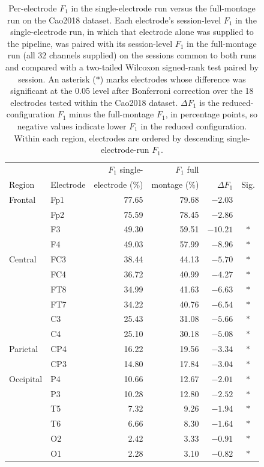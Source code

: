 \documentclass[journal,twoside,web]{ieeecolor}
\begin{document}
\begin{table}[htbp]
  \centering
  \renewcommand{\baselinestretch}{1}\normalsize
  \caption{Per-electrode $F_1$ in the single-electrode run versus the full-montage run on the Cao2018 dataset. Each electrode's session-level $F_1$ in the single-electrode run, in which that electrode alone was supplied to the pipeline, was paired with its session-level $F_1$ in the full-montage run (all 32 channels supplied) on the sessions common to both runs and compared with a two-tailed Wilcoxon signed-rank test paired by session. An asterisk ($*$) marks electrodes whose difference was significant at the 0.05 level after Bonferroni correction over the 18 electrodes tested within the Cao2018 dataset. $\Delta F_1$ is the reduced-configuration $F_1$ minus the full-montage $F_1$, in percentage points, so negative values indicate lower $F_1$ in the reduced configuration. Within each region, electrodes are ordered by descending single-electrode-run $F_1$.}
  \label{tab:app_single_cao2018}
  \footnotesize
  \setlength{\tabcolsep}{2.5pt}
  \begin{tabular}{@{}llrrrc@{}}
    \toprule
     &  & $F_1$ single- & $F_1$ full &  & \\
    Region & Electrode & electrode (\%) & montage (\%) & $\Delta F_1$ & Sig. \\
    \midrule
    Frontal & Fp1 & 77.65 & 79.68 & $-2.03$ & \\
     & Fp2 & 75.59 & 78.45 & $-2.86$ & \\
     & F3 & 49.30 & 59.51 & $-10.21$ & $*$ \\
     & F4 & 49.03 & 57.99 & $-8.96$ & $*$ \\
    \addlinespace
    Central & FC3 & 38.44 & 44.13 & $-5.70$ & $*$ \\
     & FC4 & 36.72 & 40.99 & $-4.27$ & $*$ \\
     & FT8 & 34.99 & 41.63 & $-6.63$ & $*$ \\
     & FT7 & 34.22 & 40.76 & $-6.54$ & $*$ \\
     & C3 & 25.43 & 31.08 & $-5.66$ & $*$ \\
     & C4 & 25.10 & 30.18 & $-5.08$ & $*$ \\
    \addlinespace
    Parietal & CP4 & 16.22 & 19.56 & $-3.34$ & $*$ \\
     & CP3 & 14.80 & 17.84 & $-3.04$ & $*$ \\
    \addlinespace
    Occipital & P4 & 10.66 & 12.67 & $-2.01$ & $*$ \\
     & P3 & 10.28 & 12.80 & $-2.52$ & $*$ \\
     & T5 & 7.32 & 9.26 & $-1.94$ & $*$ \\
     & T6 & 6.66 & 8.30 & $-1.64$ & $*$ \\
     & O2 & 2.42 & 3.33 & $-0.91$ & $*$ \\
     & O1 & 2.28 & 3.10 & $-0.82$ & $*$ \\
    \bottomrule
  \end{tabular}
\end{table}
 
%
%
\makeatletter
{}
\makeatother
\end{document}
